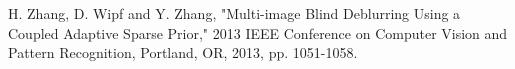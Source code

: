 \documentclass[journal]{IEEEtran}
\begin{document}
\begin{thebibliography}{1}



		H. Zhang, D. Wipf and Y. Zhang, "Multi-image Blind Deblurring Using a Coupled Adaptive Sparse Prior," 2013 IEEE Conference on Computer Vision and Pattern Recognition, Portland, OR, 2013, pp. 1051-1058.


\end{thebibliography}
\end{document}
